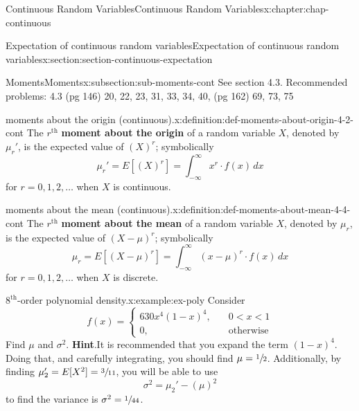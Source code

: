 \documentclass[oneside,10pt,]{book}
\newcommand{\blocktitlefont}{\relax}
\newcommand{\terminology}[1]{\textbf{#1}}
\newcommand{\lt}{<}
\newcommand{\amp}{&}
\begin{document}
\begin{chapterptx}{Continuous Random Variables}{}{Continuous Random Variables}{}{}{x:chapter:chap-continuous}
\begin{sectionptx}{Expectation of continuous random variables}{}{Expectation of continuous random variables}{}{}{x:section:section-continuous-expectation}
%
\begin{subsectionptx}{Moments}{}{Moments}{}{}{x:subsection:sub-moments-cont}
See section 4.3. Recommended problems: 4.3 (pg 146) 20, 22, 23, 31, 33, 34, 40, (pg 162) 69, 73, 75%
\begin{definition}{moments about the origin (continuous).}{x:definition:def-moments-about-origin-4-2-cont}%
The \(r^\text{th}\) \terminology{moment about the origin} of a random variable \(X\), denoted by \(\mu_r'\), is the expected value of \((X)^r\); symbolically%
\begin{equation*}
\mu_r'=E[(X)^r] = \int_{-\infty}^\infty x^r\cdot f(x)\,dx
\end{equation*}
for \(r = 0,1,2,
\dots\) when \(X\) is continuous.%
\end{definition}
\begin{definition}{moments about the mean (continuous).}{x:definition:def-moments-about-mean-4-4-cont}%
The \(\displaystyle r^\text{th}\) \terminology{moment about the mean} of a random variable \(X\), denoted by \(\displaystyle \mu_r\), is the expected value of \(\displaystyle
(X-\mu)^r\); symbolically%
\begin{equation*}
\mu_r=E[(X-\mu)^r] = \int_{-\infty}^\infty (x-\mu)^r\cdot
f(x)\,dx
\end{equation*}
for \(\displaystyle r =
0,1,2, \dots\) when \(X\) is discrete.%
\end{definition}
\begin{example}{\(8^{\text{th}}\)-order polynomial density.}{x:example:ex-poly}%
Consider%
\begin{equation*}
f(x) = \begin{cases}630x^4(1-x)^4, \amp \quad 0 \lt x \lt
1\\ 0, \amp \quad
\text{otherwise}\end{cases}
\end{equation*}
Find \(\mu\) and \(\sigma^2\).%
\textbf{\blocktitlefont Hint}.\quad{}It is recommended that you expand the term \((1-x)^4\).  Doing that, and carefully integrating, you should find \(\mu =
\sfrac{1}{2}\). Additionally, by finding \(\mu_2' = E[X^2] =
\sfrac{3}{11}\), you will be able to use%
\begin{equation*}
\sigma^2 = \mu_2' -
(\mu)^2
\end{equation*}
to find the variance is \(\sigma^2 = \sfrac{1}{44}\).%
\end{example}
\end{subsectionptx}
%
%
\typeout{************************************************}

\end{sectionptx}
\end{chapterptx}
\end{document}
